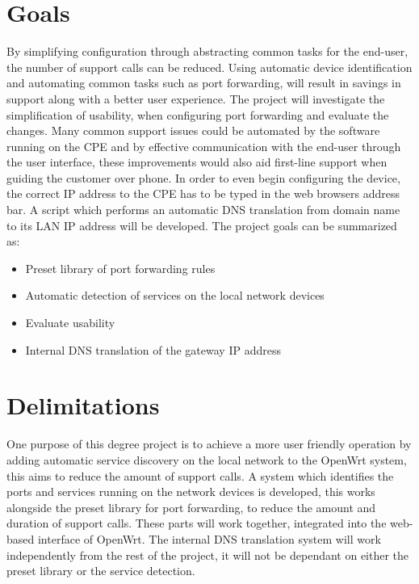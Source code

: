 \documentclass[g5paper,11pt]{kth-bcs}
\begin{document}
\section{Goals}
By simplifying configuration through abstracting common tasks for the end-user, the number of support calls can be reduced.
Using automatic device identification and automating common tasks such as port forwarding, will result in savings in support along with a better user experience.
The project will investigate the simplification of usability, when configuring port forwarding and evaluate the changes.
Many common support issues could be automated by the software running on the CPE and by effective communication with the end-user through the user interface, these improvements would also aid first-line support when guiding the customer over phone.
In order to even begin configuring the device, the correct IP address to the CPE has to be typed in the web browsers address bar.
A script which performs an automatic DNS translation from domain name to its LAN IP address will be developed.
The project goals can be summarized as:

\begin{itemize}
   \item Preset library of port forwarding rules
   \item Automatic detection of services on the local network devices
   \item Evaluate usability
   \item Internal DNS translation of the gateway IP address
\end{itemize}

\section{Delimitations}
One purpose of this degree project is to achieve a more user friendly operation by adding automatic service discovery on the local network to the OpenWrt system, this aims to reduce the amount of support calls.
A system which identifies the ports and services running on the network devices is developed, this works alongside the preset library for port forwarding, to reduce the amount and duration of support calls.
These parts will work together, integrated into the web-based interface of OpenWrt.
The internal DNS translation system will work independently from the rest of the project, it will not be dependant on either the preset library or the service detection.
\end{document}
